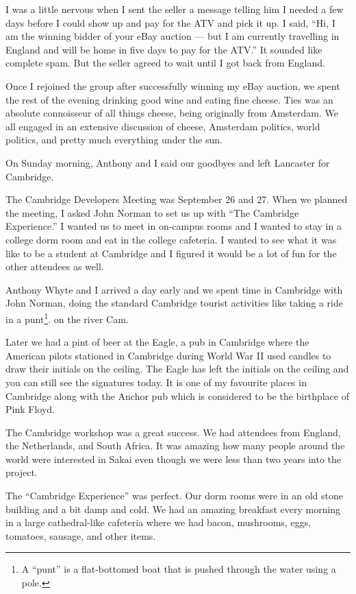 \documentclass[12pt]{book}
\begin{document}
I was a little nervous when I sent the seller a message
telling him I needed a few days before I could show
up and pay for the ATV and pick it up.
I said, ``Hi, I am the winning bidder
of your eBay auction --- but I am currently travelling
in England and will be home in five days to pay for
the ATV.''  It sounded like complete spam.  But the seller
agreed to wait until I got back from England.

Once I rejoined the group after successfully winning
my eBay auction, we spent the rest of the evening drinking
good wine and eating fine cheese.  Ties was an absolute
connoisseur of all things cheese, being originally
from Amsterdam.   We all engaged in an extensive
discussion of cheese, Amsterdam politics, world
politics, and pretty much everything under the sun.

On Sunday morning, Anthony and I said our goodbyes and
left Lancaster for Cambridge.

The Cambridge Developers Meeting was September 26 and 27.
When we planned the meeting,
I asked John Norman to set us up with ``The Cambridge Experience.''
I wanted us to meet in on-campus rooms and I wanted to stay in a
college dorm room and eat in the college cafeteria.  I wanted
to see what it was like to be a student at Cambridge and I
figured it would be a lot of fun for the other attendees
as well.

Anthony Whyte and I arrived a day early and we spent time
in Cambridge with John Norman, doing the standard Cambridge
tourist activities like taking a ride in a punt\footnote{A 
``punt'' is a flat-bottomed boat
that is pushed through the water using a pole.}.
on the river Cam.

Later we had a pint of beer at the Eagle,
a pub in Cambridge where the American pilots stationed in
Cambridge during World War II used candles to draw their
initials on the ceiling.  The Eagle has left
the initials on the ceiling and you can still see the signatures
today.  It is one of my favourite places in
Cambridge along with the Anchor pub which is considered
to be the birthplace of Pink Floyd.

The Cambridge workshop was a great success.
We had attendees from England, the Netherlands,
and South Africa.   It was amazing how many people
around the world were interested in Sakai even though we
were less than two years into the project.

The ``Cambridge Experience'' was perfect.  Our dorm rooms
were in an old stone building and a bit damp and cold.
We had an amazing breakfast every morning in a large
cathedral-like cafeteria where we had bacon,
mushrooms, eggs, tomatoes, sausage, and other items.
\end{document}

